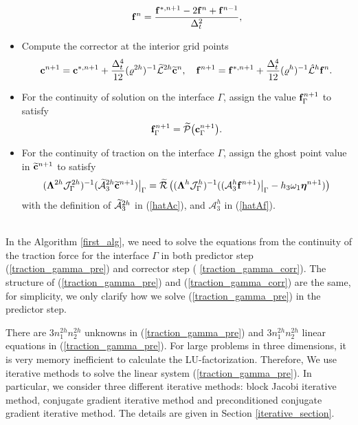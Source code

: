 \begin{breakablealgorithm}
\begin{itemize}
{\begin{equation*}
			{\bf f}^{n} = \frac{{\bf f}^{*,n+1}-2{\bf f}^{n}+{\bf f}^{n-1}}{\Delta^2_t},
			\end{equation*}
		}
		\item{Compute the corrector at the interior grid points
			\begin{equation*}
			{\bf c}^{n+1} = {\bf c}^{*,n+1} + \frac{\Delta_t^4}{12}(\varrho^{2h})^{-1}\wt{\mathcal{L}}^{2h}\wt{\bf{c}}^{n},\ \ \ 
			{\bf f}^{n+1} = {\bf f}^{*,n+1} + \frac{\Delta_t^4}{12}(\varrho^{h})^{-1}\hat{\mathcal{L}}^{h}{\bf{f}}^{n}.
			\end{equation*}
		}
		\item{For the continuity of solution on the interface $\Gamma$, assign the value ${\bf f}^{n+1}_\Gamma$ to satisfy
			\begin{equation*}
			{\bf f}^{n+1}_{\Gamma} = \widetilde{\mathcal{P}}\big({\bf c}^{n+1}_{\Gamma}\big).
			\end{equation*}
		}
		\item{For the continuity of traction on the interface $\Gamma$, assign the ghost point value in $\widetilde{\bf c}^{n+1}$ to satisfy
			\begin{equation}\label{traction_gamma_corr}
			(\bm{\Lambda}^{2h}{\mathcal J}_{\Gamma}^{2h})^{-1}(\wt{\mathcal{A}}_3^{2h}\wt{\bf c}^{n+1})\big|_\Gamma
			= \wt{\mathcal{R}}\left((\bm{\Lambda}^{h}{\mathcal J}^h_{\Gamma})^{-1}((\mathcal{A}_3^h{\bf f}^{n+1})\big|_\Gamma-h_3\omega_1{\bm \eta}^{n+1})\right)
			\end{equation}
			with the definition of $\widetilde{\mathcal{A}}_3^{2h}$ in (\ref{hatAc}), and $\mathcal{A}_3^h$ in (\ref{hatAf}).
		}
	\end{itemize}
\end{breakablealgorithm}
~\\

In the Algorithm \ref{first_alg}, we need to solve the equations from the continuity of the traction force for the interface $\Gamma$ in both predictor step (\ref{traction_gamma_pre}) and corrector step (
\ref{traction_gamma_corr}). The structure of (\ref{traction_gamma_pre}) and (\ref{traction_gamma_corr}) are the same, for simplicity, we only clarify how we solve (\ref{traction_gamma_pre}) in the predictor step.

There are $3n_1^{2h}n_2^{2h}$ unknowns in (\ref{traction_gamma_pre}) and $3n_1^{2h}n_2^{2h}$ linear equations in (\ref{traction_gamma_pre}). For large problems in three dimensions, it is very memory inefficient to calculate the LU-factorization. Therefore, We use iterative methods to solve the linear system (\ref{traction_gamma_pre}). In particular, we consider three different iterative methods: block Jacobi iterative method, conjugate gradient iterative method and preconditioned conjugate gradient iterative method. The details are given in Section \ref{iterative_section}.